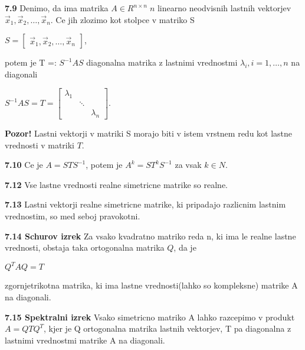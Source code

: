 \documentclass{article}
\begin{document}
\begin{multicols}{3}
\textbf{7.9} Denimo, da ima matrika $A \in R^{n \times n}\; n$ linearno neodvisnih lastnih vektorjev
$\vec{x}_{1}, \vec{x}_{2}, \dots, \vec{x}_{n}$. Ce jih zlozimo kot stolpce v matriko S
\begin{center}
    \begin{math}
        S =
        \begin{bmatrix}
            \vec{x}_{1}, \vec{x}_{2}, \dots, \vec{x}_{n}
        \end{bmatrix}
    \end{math},
\end{center}
potem je T =: $S^{-1}AS$ diagonalna matrika z lastnimi vrednostmi $\lambda_{i}, i = 1, \dots, n$ na diagonali
\begin{center}
    \begin{math}
        S^{-1}AS = T =
        \begin{bmatrix}
            \lambda_{1} & &\\
            &   \ddots  &  \\
            & &     \lambda_{n} 
        \end{bmatrix}
    \end{math}.
\end{center}

\textbf{Pozor!} Lastni vektorji v matriki S morajo biti v istem vrstnem redu kot lastne vrednosti v matriki $T$.

\textbf{7.10} Ce je $A = STS^{-1}$, potem je $A^{k} = ST^{k}S^{-1}$ za vsak $k \in N$.

\textbf{7.12} Vse lastne vrednosti realne simetricne matrike so realne.

\textbf{7.13} Lastni vektorji realne simetricne matrike, ki pripadajo razlicnim lastnim
vrednostim, so med seboj pravokotni.

\textbf{7.14 Schurov izrek} Za vsako kvadratno matriko reda n, ki ima le realne lastne vrednosti,
obstaja taka ortogonalna matrika $Q$, da je 
\begin{center}
    \begin{math}
        Q^{T}AQ = T
    \end{math}
\end{center} 
zgornjetrikotna matrika, ki ima lastne vrednosti(lahko so kompleksne) matrike A na diagonali.

\textbf{7.15 Spektralni izrek} Vsako simetricno matriko A lahko razcepimo v produkt
$A = QTQ^{T}$, kjer je Q ortogonalna matrika lastnih vektorjev, T pa diagonalna z lastnimi
vrednostmi matrike A na diagonali.


\end{multicols}
\end{document}
